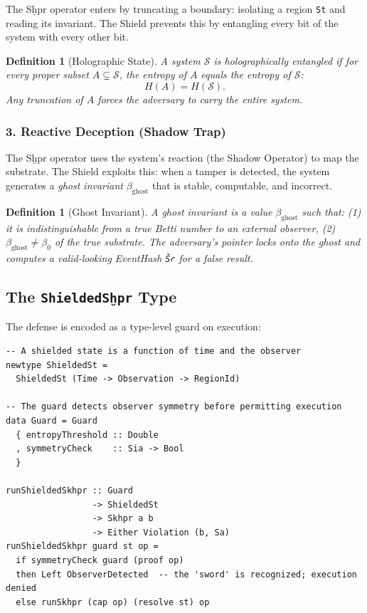 \documentclass[11pt,letterpaper]{article}
\newtheorem{definition}[theorem]{Definition}
\begin{document}
The Sḫpr operator enters by truncating a boundary: isolating a region
\texttt{St} and reading its invariant.  The Shield prevents this by
entangling every bit of the system with every other bit.

\begin{definition}[Holographic State]
A system $\mathcal{S}$ is \emph{holographically entangled} if for every
proper subset $A \subsetneq \mathcal{S}$, the entropy of $A$ equals the
entropy of $\mathcal{S}$:
\[
H(A) = H(\mathcal{S}).
\]
Any truncation of $A$ forces the adversary to carry the entire system.
\end{definition}

\subsubsection*{3. Reactive Deception (Shadow Trap)}

The Sḫpr operator uses the system's reaction (the Shadow Operator) to map
the substrate.  The Shield exploits this: when a tamper is detected, the
system generates a \emph{ghost invariant} $\beta_{\mathrm{ghost}}$ that is
stable, computable, and incorrect.

\begin{definition}[Ghost Invariant]
A ghost invariant is a value $\beta_{\mathrm{ghost}}$ such that:
(1) it is indistinguishable from a true Betti number to an external observer,
(2) $\beta_{\mathrm{ghost}} \neq \beta_0$ of the true substrate.
The adversary's pointer locks onto the ghost and computes a valid-looking
EventHash \texttt{Šꜥ} for a false result.
\end{definition}

\subsection{The \texttt{ShieldedSḫpr} Type}

The defense is encoded as a type-level guard on execution:

\begin{lstlisting}
-- A shielded state is a function of time and the observer
newtype ShieldedSt =
  ShieldedSt (Time -> Observation -> RegionId)

-- The guard detects observer symmetry before permitting execution
data Guard = Guard
  { entropyThreshold :: Double
  , symmetryCheck    :: Sia -> Bool
  }

runShieldedSkhpr :: Guard
                 -> ShieldedSt
                 -> Skhpr a b
                 -> Either Violation (b, Sa)
runShieldedSkhpr guard st op =
  if symmetryCheck guard (proof op)
  then Left ObserverDetected  -- the 'sword' is recognized; execution denied
  else runSkhpr (cap op) (resolve st) op
\end{lstlisting}
\end{document}
